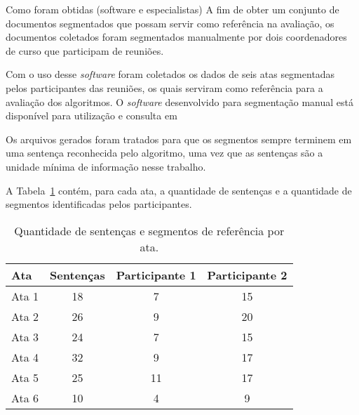 









Como foram obtidas (software e especialistas) 
A fim de obter um conjunto de documentos segmentados que possam servir como referência na avaliação, os documentos coletados foram segmentados manualmente por dois coordenadores de curso que participam de reuniões. 


Com o uso desse \textit{software} foram coletados os dados de seis atas segmentadas pelos participantes das reuniões, os quais serviram como referência para a avaliação dos algoritmos. O \textit{software} desenvolvido para segmentação manual está disponível para utilização e consulta em~\urlsoftwares	

Os arquivos gerados foram tratados para que os segmentos sempre terminem em uma sentença reconhecida pelo algoritmo, uma vez que as sentenças são a unidade mínima de informação nesse trabalho.

A Tabela~\ref{tab:segmentacaoreferencia} contém, para cada ata, a quantidade de sentenças e a quantidade de segmentos identificadas pelos participantes.


\begin{table}[!h]
	\centering
	\begin{tabular}{|l|c|c|c|} \hline
		\textbf{Ata} & \textbf{Sentenças}  & 
		\textbf{Participante 1}  & 
		\textbf{Participante 2} \\	\hline

		Ata 1 & 18 & 7  & 15 \\ \hline 
		Ata 2 & 26 & 9  & 20 \\ \hline 
		Ata 3 & 24 & 7  & 15 \\ \hline 
		Ata 4 & 32 & 9  & 17 \\ \hline 
		Ata 5 & 25 & 11 & 17 \\ \hline 
		Ata 6 & 10 & 4  & 9  \\ \hline 

	\end{tabular}
	\caption{Quantidade de sentenças e segmentos de referência por ata.}
	\label{tab:segmentacaoreferencia}
\end{table}
























